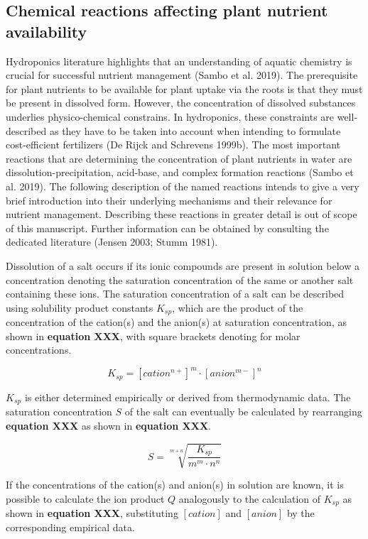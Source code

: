 \documentclass[
]{article}
\begin{document}
\hypertarget{chemical-reactions-affecting-plant-nutrient-availability}{%
\subsection{Chemical reactions affecting plant nutrient availability}\label{chemical-reactions-affecting-plant-nutrient-availability}}

Hydroponics literature highlights that an understanding of aquatic chemistry is crucial for successful nutrient management (Sambo et al. 2019). The prerequisite for plant nutrients to be available for plant uptake via the roots is that they must be present in dissolved form. However, the concentration of dissolved substances underlies physico-chemical constrains. In hydroponics, these constraints are well-described as they have to be taken into account when intending to formulate cost-efficient fertilizers (De Rijck and Schrevens 1999b).
The most important reactions that are determining the concentration of plant nutrients in water are dissolution-precipitation, acid-base, and complex formation reactions (Sambo et al. 2019). The following description of the named reactions intends to give a very brief introduction into their underlying mechanisms and their relevance for nutrient management. Describing these reactions in greater detail is out of scope of this manuscript. Further information can be obtained by consulting the dedicated literature (Jensen 2003; Stumm 1981).

Dissolution of a salt occurs if its ionic compounds are present in solution below a concentration denoting the saturation concentration of the same or another salt containing these ions. The saturation concentration of a salt can be described using solubility product constants \(K_{sp}\), which are the product of the concentration of the cation(s) and the anion(s) at saturation concentration, as shown in \textbf{equation XXX}, with square brackets denoting for molar concentrations.

\[
K_{sp} = [cation^{n+}]^{m} \cdot [anion^{m-}]^{n}
\]

\(K_{sp}\) is either determined empirically or derived from thermodynamic data. The saturation concentration \(S\) of the salt can eventually be calculated by rearranging \textbf{equation XXX} as shown in \textbf{equation XXX}.

\[
S = \sqrt[m+n]{\frac{K_{sp}}{m^{m} \cdot n^{n}}}
\]

If the concentrations of the cation(s) and anion(s) in solution are known, it is possible to calculate the ion product \(Q\) analogously to the calculation of \(K_{sp}\) as shown in \textbf{equation XXX}, substituting \([cation]\) and \([anion]\) by the corresponding empirical data.
\end{document}
